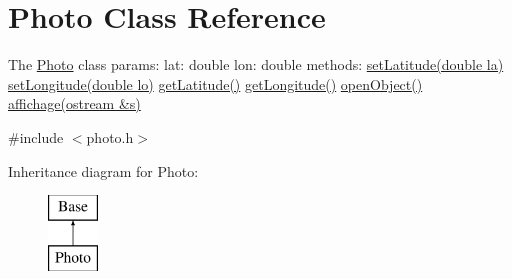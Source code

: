\hypertarget{classPhoto}{\section{Photo Class Reference}
\label{classPhoto}
}


The \hyperlink{classPhoto}{Photo} class params\-: lat\-: double lon\-: double methods\-: \hyperlink{classPhoto_a2a33bfd34dc606f17f4cb4ff1505afbe}{set\-Latitude(double la)} \hyperlink{classPhoto_a5846dcbc510174ed2db5cbbe99367a7f}{set\-Longitude(double lo)} \hyperlink{classPhoto_ac96f7a44787994f828e1fb24a4bdf768}{get\-Latitude()} \hyperlink{classPhoto_a736b26be1028d360f59800512b89b287}{get\-Longitude()} \hyperlink{classPhoto_a37b62ddde8114037efc2f8a8e97d0df0}{open\-Object()} \hyperlink{classPhoto_a2965c65d2ad33ebf2ac3b3cfad123fbb}{affichage(ostream \&s)}  




{\ttfamily \#include $<$photo.\-h$>$}

Inheritance diagram for Photo\-:\begin{figure}[H]
\begin{center}
\leavevmode
\includegraphics[height=2.000000cm]{classPhoto}
\end{center}
\end{figure}

